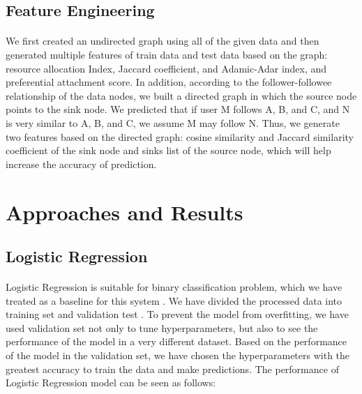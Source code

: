 \documentclass[fleqn,11pt]{olplainarticle}
\begin{document}
\subsection{Feature Engineering}\label{feature}
\paragraph*{}
We first created an undirected graph using all of the given data and then generated multiple features of train data and test data based on the graph: resource allocation Index, Jaccard coefficient, and Adamic-Adar index, and preferential attachment score. In addition, according to the follower-followee relationship of the data nodes, we built a directed graph in which the source node points to the sink node. We predicted that if user M follows A, B, and C, and N is very similar to A, B, and C, we assume M may follow N. Thus, we generate two features based on the directed graph: cosine similarity and Jaccard similarity coefficient of the sink node and sinks list of the source node, which will help increase the accuracy of prediction.


\section{Approaches and Results}\label{appres}

\subsection{Logistic Regression}\label{lr}
\paragraph*{}
Logistic Regression is suitable for binary classification problem, which we have treated as a baseline for this system \citep{menard_lr}. We have divided the processed data into training set and validation test \citep{scikit-learn}. To prevent the model from overfitting, we have used validation set not only to tune hyperparameters, but also to see the performance of the model in a very different dataset. Based on the performance of the model in the validation set, we have chosen the hyperparameters with the greatest accuracy to train the data and make predictions. The performance of Logistic Regression model can be seen as follows:
\end{document}
